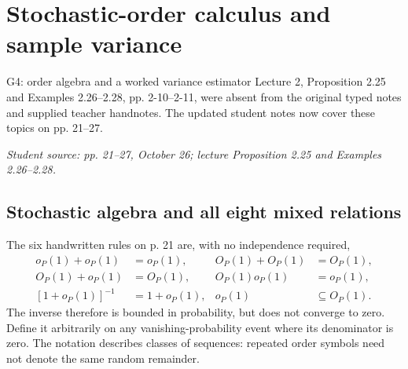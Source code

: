 \documentclass[12pt]{article}
\begin{document}
\section{Stochastic-order calculus and sample variance}
\begin{gapbox}{G4: order algebra and a worked variance estimator}
Lecture 2, Proposition 2.25 and Examples 2.26--2.28, pp. 2-10--2-11,
were absent from the original typed notes and supplied teacher handnotes.
The updated student notes now cover these topics on pp. 21--27.
\end{gapbox}
\textit{Student source: pp. 21--27, October 26; lecture Proposition 2.25
and Examples 2.26--2.28.}

\subsection{Stochastic algebra and all eight mixed relations}
The six handwritten rules on p. 21 are, with no independence required,
\begin{align}
 o_P(1)+o_P(1)&=o_P(1),& O_P(1)+O_P(1)&=O_P(1),\\
 O_P(1)+o_P(1)&=O_P(1),& O_P(1)o_P(1)&=o_P(1),\\
 [1+o_P(1)]^{-1}&=1+o_P(1),& o_P(1)&\subseteq O_P(1).
\end{align}
The inverse therefore is bounded in probability, but does not converge to
zero. Define it arbitrarily on any vanishing-probability event where its
denominator is zero. The notation describes classes of sequences: repeated
order symbols need not denote the same random remainder.
\end{document}
